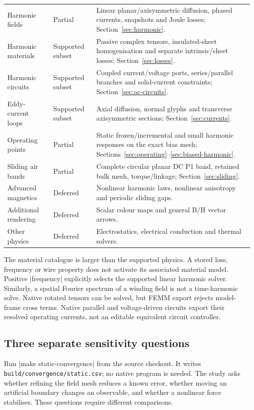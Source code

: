 \begin{longtable}{p{.24\linewidth}p{.13\linewidth}p{.53\linewidth}}
Harmonic fields & Partial & Linear planar/axisymmetric diffusion, phased currents, snapshots and Joule losses; Section~\ref{sec:harmonic}.\\
Harmonic materials & Supported subset & Passive complex tensors, insulated-sheet homogenisation and separate intrinsic/sheet losses; Section~\ref{sec:losses}.\\
Harmonic circuits & Supported subset & Coupled current/voltage ports, series/parallel branches and solid-current constraints; Section~\ref{sec:ac-circuits}.\\
Eddy-current loops & Supported subset & Axial diffusion, normal glyphs and transverse axisymmetric sections; Section~\ref{sec:currents}.\\
Operating points & Partial & Static frozen/incremental and small harmonic responses on the exact bias mesh; Sections~\ref{sec:operating}--\ref{sec:biased-harmonic}.\\
Sliding air bands & Partial & Complete circular planar DC P1 band, retained bulk mesh, torque/linkage; Section~\ref{sec:sliding}.\\
Advanced magnetics & Deferred & Nonlinear harmonic laws, nonlinear anisotropy and periodic sliding gaps.\\
Additional rendering & Deferred & Scalar colour maps and general B/H vector arrows.\\
Other physics & Deferred & Electrostatics, electrical conduction and thermal solvers.\\
\bottomrule
\end{longtable}

The material catalogue is larger than the supported physics. A stored loss,
frequency or wire property does not activate its associated material model.
Positive |frequency| explicitly selects the supported linear harmonic solver. Similarly,
a spatial Fourier spectrum of a winding field is not a time-harmonic solve.
Native rotated tensors can be solved, but FEMM export rejects model-frame
cross terms. Native parallel and voltage-driven circuits export their resolved
operating currents, not an editable equivalent circuit controller.

\subsection{Three separate sensitivity questions}
Run |make static-convergence| from the source checkout. It writes
\nolinkurl{build/convergence/static.csv}; no native program is needed.
The study asks whether refining the field mesh reduces a known error, whether
moving an artificial boundary changes an observable, and whether a nonlinear
force stabilises. These questions require different comparisons.

